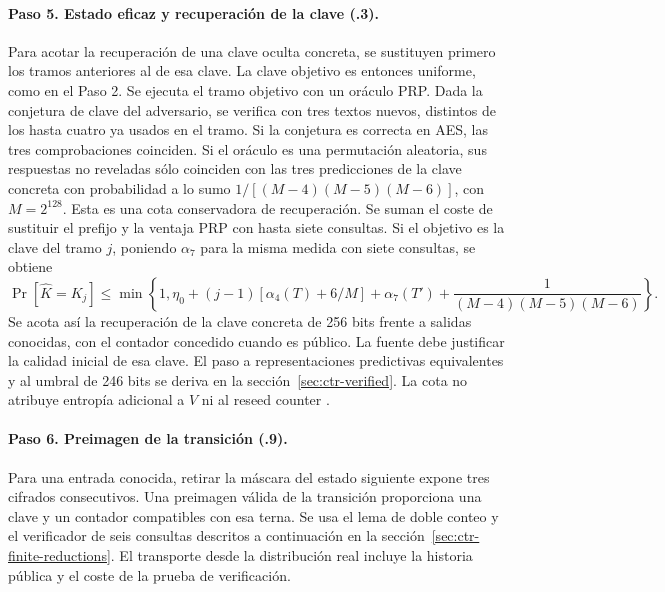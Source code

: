 \documentclass[11pt,a4paper]{article}
\begin{document}
\paragraph{Paso 5. Estado eficaz y recuperación de la clave (.3).}
Para acotar la recuperación de una clave
oculta concreta, se sustituyen primero
los tramos anteriores al de esa clave.
La clave objetivo es entonces uniforme,
como en el Paso 2. Se ejecuta el tramo
objetivo con un oráculo PRP. Dada la
conjetura de clave del adversario, se
verifica con tres textos nuevos, distintos
de los hasta cuatro ya usados en el tramo.
Si la conjetura es correcta en AES,
las tres comprobaciones coinciden.
Si el oráculo es una permutación
aleatoria, sus respuestas no reveladas
sólo coinciden con las tres predicciones
de la clave concreta con probabilidad
a lo sumo \(1/[(M-4)(M-5)(M-6)]\), con
\(M=2^{128}\). Esta es una cota
conservadora de recuperación. Se suman
el coste de sustituir el prefijo y la
ventaja PRP con hasta siete consultas.
Si el objetivo es la clave del tramo \(j\), poniendo
\(\alpha_7\) para la misma medida con siete consultas,
se obtiene
\[
 \Pr[\widehat K=K_j]
 \le \min\left\{1,\eta_0+(j-1)[\alpha_4(T)+6/M]
        +\alpha_7(T')+\frac1{(M-4)(M-5)(M-6)}\right\}.
\]
Se acota así la recuperación de la clave concreta de
256 bits frente a salidas conocidas,
con el contador concedido cuando es
público. La fuente debe justificar
la calidad inicial de esa clave. El paso a representaciones predictivas equivalentes y al umbral de 246 bits se deriva en la sección~\ref{sec:ctr-verified}.
La cota no atribuye entropía adicional
a \(V\) ni al reseed counter
\cite[§§93--103 y 207]{ais}.

\paragraph{Paso 6. Preimagen de la transición (.9).}
Para una entrada conocida, retirar la máscara del estado siguiente expone tres
cifrados consecutivos. Una preimagen válida de la transición proporciona una
clave y un contador compatibles con esa terna. Se usa el lema de doble conteo y
el verificador de seis consultas descritos a continuación en la
sección~\ref{sec:ctr-finite-reductions}. El transporte desde la distribución real incluye
la historia pública y el coste de la prueba de verificación.
\end{document}
